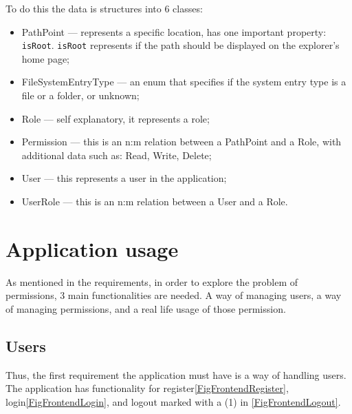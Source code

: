 To do this the data is structures into 6 classes:
\begin{itemize}
	\item PathPoint --- represents a specific location, has one important property: \verb|isRoot|. \verb|isRoot| represents if the path should be displayed on the explorer's home page;
 	\item FileSystemEntryType --- an enum that specifies if the system entry type is a file or a folder, or unknown;
	\item Role --- self explanatory, it represents a role;
	\item Permission --- this is an n:m relation between a PathPoint and a Role, with additional data such as: Read, Write, Delete;
	\item User --- this represents a user in the application;
 	\item UserRole --- this is an n:m relation between a User and a Role.
\end{itemize}

\section{Application usage}
As mentioned in the requirements, in order to explore the problem of permissions, 3 main functionalities are needed. A way of managing users, a way of managing permissions, and a real life usage of those permission.
\subsection{Users}
Thus, the first requirement the application must have is a way of handling users. The application has functionality for register\ref{FigFrontendRegister}, login\ref{FigFrontendLogin}, and logout marked with a (1) in \ref{FigFrontendLogout}.

